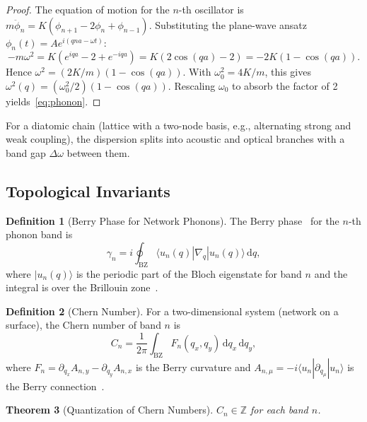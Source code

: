 \documentclass[11pt,twocolumn,a4paper]{article}
\newtheorem{theorem}{Theorem}[section]
\theoremstyle{definition}
\newtheorem{definition}[theorem]{Definition}
\newcommand{\Z}{\mathbb{Z}}
\newcommand{\dif}{\mathrm{d}}
\begin{document}
\begin{proof}
The equation of motion for the $n$-th oscillator is
$m\ddot{\phi}_n = K(\phi_{n+1} - 2\phi_n + \phi_{n-1})$.
Substituting the plane-wave ansatz $\phi_n(t) = A e^{i(qna - \omega t)}$:
\begin{equation}
  -m\omega^2 = K(e^{iqa} - 2 + e^{-iqa}) = K(2\cos(qa) - 2) = -2K(1 - \cos(qa)).
\end{equation}
Hence $\omega^2 = (2K/m)(1 - \cos(qa))$. With $\omega_0^2 = 4K/m$, this gives
$\omega^2(q) = (\omega_0^2/2)(1 - \cos(qa))$. Rescaling $\omega_0$ to absorb the factor
of 2 yields~\eqref{eq:phonon}.
\end{proof}

For a diatomic chain (lattice with a two-node basis, e.g., alternating strong and weak
coupling), the dispersion splits into acoustic and optical branches with a band gap
$\Delta\omega$ between them.

\subsection{Topological Invariants}\label{sec:topo:invariants}

\begin{definition}[Berry Phase for Network Phonons]\label{def:berry_phase}
The Berry phase~\cite{berry1984} for the $n$-th phonon band is
\begin{equation}\label{eq:berry_phase}
  \gamma_n = i \oint_{\mathrm{BZ}} \langle u_n(q) | \nabla_q | u_n(q) \rangle \, \dif q,
\end{equation}
where $|u_n(q)\rangle$ is the periodic part of the Bloch eigenstate for band $n$ and the
integral is over the Brillouin zone~\cite{berry1984,nakahara2003}.
\end{definition}

\begin{definition}[Chern Number]\label{def:chern}
For a two-dimensional system (network on a surface), the Chern number of band $n$ is
\begin{equation}\label{eq:chern}
  C_n = \frac{1}{2\pi} \int_{\mathrm{BZ}} F_n(q_x, q_y) \, \dif q_x \, \dif q_y,
\end{equation}
where $F_n = \partial_{q_x} A_{n,y} - \partial_{q_y} A_{n,x}$ is the Berry curvature and
$A_{n,\mu} = -i\langle u_n | \partial_{q_\mu} | u_n \rangle$ is the Berry
connection~\cite{thouless1982,nakahara2003}.
\end{definition}

\begin{theorem}[Quantization of Chern Numbers]\label{thm:chern_quantized}
$C_n \in \Z$ for each band $n$.
\end{theorem}
\end{document}

